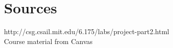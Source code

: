 \documentclass{article}
\begin{document}




\section{Sources}

http://csg.csail.mit.edu/6.175/labs/project-part2.html
\\
Course material from Canvas
\end{document}
